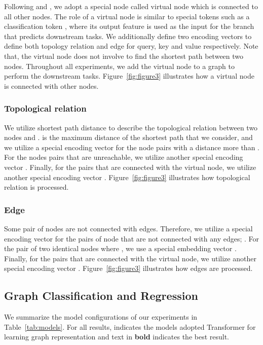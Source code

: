 \documentclass[letterpaper]{article} \usepackage{aaai23}  \usepackage{times}  \usepackage{helvet}  \usepackage{courier}  \usepackage[hyphens]{url}  \usepackage{graphicx} \urlstyle{rm} \def\UrlFont{\rm}  \usepackage{natbib}  \usepackage{caption} \frenchspacing  \setlength{\pdfpagewidth}{8.5in} \setlength{\pdfpageheight}{11in} \usepackage{algorithm}
\begin{document}
Following \citeauthor{mpnn_gilmer2017neural} and \citeauthor{ying2021transformers}, we adopt a special node called virtual node which is connected to all other nodes.
The role of a virtual node is similar to special tokens such as a classification token \citep{devlin2018bert}, where its output feature  is used as the input for the branch that predicts downstream tasks.
We additionally define two encoding vectors to define both topology relation  and edge  for query, key and value respectively.
Note that, the virtual node does not involve to find the shortest path between two nodes.
Throughout all experiments, we add the virtual node to a graph to perform the downstream tasks.
Figure~\ref{fig:figure3} illustrates how a virtual node is connected with other nodes.

\subsubsection{Topological relation}
We utilize shortest path distance  to describe the topological relation between two nodes  and .
  is the maximum distance of the shortest path that we consider, and we utilize a special encoding vector  for the node pairs with a distance more than .
For the nodes pairs that are unreachable, we utilize another special encoding vector .
Finally, for the pairs that are connected with the virtual node, we utilize another special encoding vector .
Figure~\ref{fig:figure3} illustrates how topological relation is processed.


\subsubsection{Edge}

Some pair of nodes are not connected with edges.
Therefore, we utilize a special encoding vector  for the pairs of node that are not connected with any edges; .
For the pair of two identical nodes where , we use a special embedding vector .
Finally, for the pairs that are connected with the virtual node, we utilize another special encoding vector .
Figure~\ref{fig:figure3} illustrates how edges are processed.

\subsection{Graph Classification and Regression}

 We summarize the model configurations of our experiments in Table~\ref{tab:models}.
 For all results, 
 indicates the models adopted Transformer for learning graph representation
and text in \textbf{bold}
indicates the best result.
\end{document}
